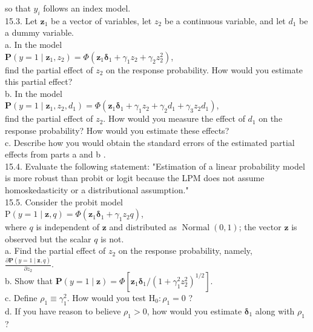 \documentclass[10pt]{article}
\begin{document}
so that $y_{i}$ follows an index model.\\
15.3. Let $\mathbf{z}_{1}$ be a vector of variables, let $z_{2}$ be a continuous variable, and let $d_{1}$ be a dummy variable.\\
a. In the model\\
$\mathbf{P}\left(y=1 \mid \mathbf{z}_{1}, z_{2}\right)=\Phi\left(\mathbf{z}_{1} \boldsymbol{\delta}_{1}+\gamma_{1} z_{2}+\gamma_{2} z_{2}^{2}\right)$,\\
find the partial effect of $z_{2}$ on the response probability. How would you estimate this partial effect?\\
b. In the model\\
$\mathbf{P}\left(y=1 \mid \mathbf{z}_{1}, z_{2}, d_{1}\right)=\Phi\left(\mathbf{z}_{1} \boldsymbol{\delta}_{1}+\gamma_{1} z_{2}+\gamma_{2} d_{1}+\gamma_{3} z_{2} d_{1}\right)$,\\
find the partial effect of $z_{2}$. How would you measure the effect of $d_{1}$ on the response probability? How would you estimate these effects?\\
c. Describe how you would obtain the standard errors of the estimated partial effects from parts a and b .\\
15.4. Evaluate the following statement: "Estimation of a linear probability model is more robust than probit or logit because the LPM does not assume homoskedasticity or a distributional assumption."\\
15.5. Consider the probit model\\
$\mathrm{P}(y=1 \mid \mathbf{z}, q)=\Phi\left(\mathbf{z}_{1} \boldsymbol{\delta}_{1}+\gamma_{1} z_{2} q\right)$,\\
where $q$ is independent of $\mathbf{z}$ and distributed as $\operatorname{Normal}(0,1)$; the vector $\mathbf{z}$ is observed but the scalar $q$ is not.\\
a. Find the partial effect of $z_{2}$ on the response probability, namely,\\
$\frac{\partial \mathbf{P}(y=1 \mid \mathbf{z}, q)}{\partial z_{2}}$.\\
b. Show that $\mathbf{P}(y=1 \mid \mathbf{z})=\Phi\left[\mathbf{z}_{1} \boldsymbol{\delta}_{1} /\left(1+\gamma_{1}^{2} z_{2}^{2}\right)^{1 / 2}\right]$.\\
c. Define $\rho_{1} \equiv \gamma_{1}^{2}$. How would you test $\mathrm{H}_{0}: \rho_{1}=0$ ?\\
d. If you have reason to believe $\rho_{1}>0$, how would you estimate $\boldsymbol{\delta}_{1}$ along with $\rho_{1}$ ?\\
\end{document}
